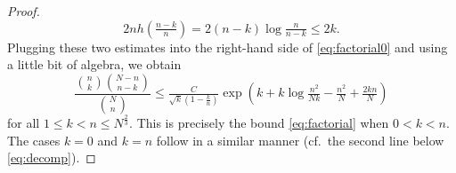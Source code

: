\documentclass[10pt,a4paper]{amsart}
\begin{document}
\begin{proof}
\begin{equation*}
 2nh(\tfrac{n-k}{n}) = 2(n - k)\log \tfrac{n}{n - k} \le 2k. 
\end{equation*}
Plugging these two estimates into the right-hand side of \eqref{eq:factorial0} and 
using a little bit of algebra, we obtain
\begin{equation*}
 \frac{\binom{n}{k}\binom{N - n}{n - k}}{\binom{N}{n}} \le \tfrac{C}{\sqrt{k}(1 - \frac k n)}\exp(k + k\log \tfrac {n^2}{Nk} -\tfrac{n^2}N + \tfrac{2kn}N)
\end{equation*}
for all %
$1 \le k < n \le N^{\frac 23}$. This is precisely the bound \eqref{eq:factorial} 
when $0 < k < n$. The cases $k = 0$ and $k = n$ follow in a similar manner 
(cf.~the second line below \eqref{eq:decomp}).
\end{proof}
\end{document}
